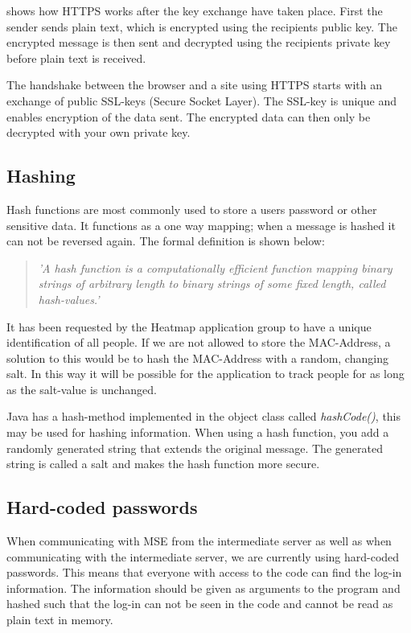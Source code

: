  shows how HTTPS works after the key exchange have taken place. First the sender sends plain text, which is encrypted using the recipients public key. The encrypted message is then sent and decrypted using the recipients private key before plain text is received.

The handshake between the browser and a site using HTTPS starts with an exchange of public SSL-keys (Secure Socket Layer). The SSL-key is unique and enables encryption of the data sent. The encrypted data can then only be decrypted with your own private key\cite{HTTPS}. 

\subsection*{Hashing}
Hash functions are most commonly used to store a users password or other sensitive data. It functions as a one way mapping; when a message is hashed it can not be reversed again. The formal definition is shown below:
\begin{quote}
\textit{'A hash function is a computationally efficient function mapping binary strings of arbitrary length to binary strings of some fixed length, called hash-values.'\cite{Hash_def}}
\end{quote}

It has been requested by the Heatmap application group to have a unique identification of all people. If we are not allowed to store the MAC-Address, a solution to this would be to hash the MAC-Address with a random, changing salt. In this way it will be possible for the application to track people for as long as the salt-value is unchanged.

Java has a hash-method implemented in the object class called \textit{hashCode()}, this may be used for hashing information. When using a hash function, you add a randomly generated string that extends the original message. The generated string is called a salt and makes the hash function more secure.

\subsection*{Hard-coded passwords}
When communicating with MSE from the intermediate server as well as when communicating with the intermediate server, we are currently using hard-coded passwords. This means that everyone with access to the code can find the log-in information. The information should be given as arguments to the program and hashed such that the log-in can not be seen in the code and cannot be read as plain text in memory. 

